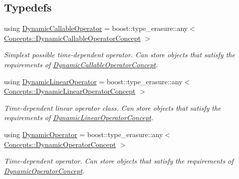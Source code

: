 \subsection*{Typedefs}
\begin{DoxyCompactItemize}
\item 
using \hyperlink{group__SpacyGroup_ga750d55072f7a3a16a1263961147333c0_ga750d55072f7a3a16a1263961147333c0}{Dynamic\+Callable\+Operator} = boost\+::type\+\_\+erasure\+::any$<$ \hyperlink{group__ConceptGroup_ga30692db093ead5a1a074905363a2f043_ga30692db093ead5a1a074905363a2f043}{Concepts\+::\+Dynamic\+Callable\+Operator\+Concept} $>$
\begin{DoxyCompactList}\small\item\em Simplest possible time-\/dependent operator. Can store objects that satisfy the requirements of \hyperlink{group__ConceptGroup_ga30692db093ead5a1a074905363a2f043_DynamicCallableOperatorConceptAnchor}{Dynamic\+Callable\+Operator\+Concept}. \end{DoxyCompactList}\item 
using \hyperlink{group__SpacyGroup_gaad10aa7d5443703377b768fa41a3c7ea_gaad10aa7d5443703377b768fa41a3c7ea}{Dynamic\+Linear\+Operator} = boost\+::type\+\_\+erasure\+::any$<$ \hyperlink{group__ConceptGroup_ga015b0d099011a2ef73a16aa9b36a7346_ga015b0d099011a2ef73a16aa9b36a7346}{Concepts\+::\+Dynamic\+Linear\+Operator\+Concept} $>$
\begin{DoxyCompactList}\small\item\em Time-\/dependent linear operator class. Can store objects that satisfy the requirements of \hyperlink{group__ConceptGroup_ga015b0d099011a2ef73a16aa9b36a7346_DynamicLinearOperatorConceptAnchor}{Dynamic\+Linear\+Operator\+Concept}. \end{DoxyCompactList}\item 
using \hyperlink{group__SpacyGroup_ga8e692134dfe46346d5692acfd1a9bd8e_ga8e692134dfe46346d5692acfd1a9bd8e}{Dynamic\+Operator} = boost\+::type\+\_\+erasure\+::any$<$ \hyperlink{group__ConceptGroup_ga2c979d268f0ca7a436776a9631d10af7_ga2c979d268f0ca7a436776a9631d10af7}{Concepts\+::\+Dynamic\+Operator\+Concept} $>$
\begin{DoxyCompactList}\small\item\em Time-\/dependent operator. Can store objects that satisfy the requirements of \hyperlink{group__ConceptGroup_ga2c979d268f0ca7a436776a9631d10af7_DynamicOperatorConceptAnchor}{Dynamic\+Operator\+Concept}. \end{DoxyCompactList}\item 

\end{DoxyCompactItemize}
